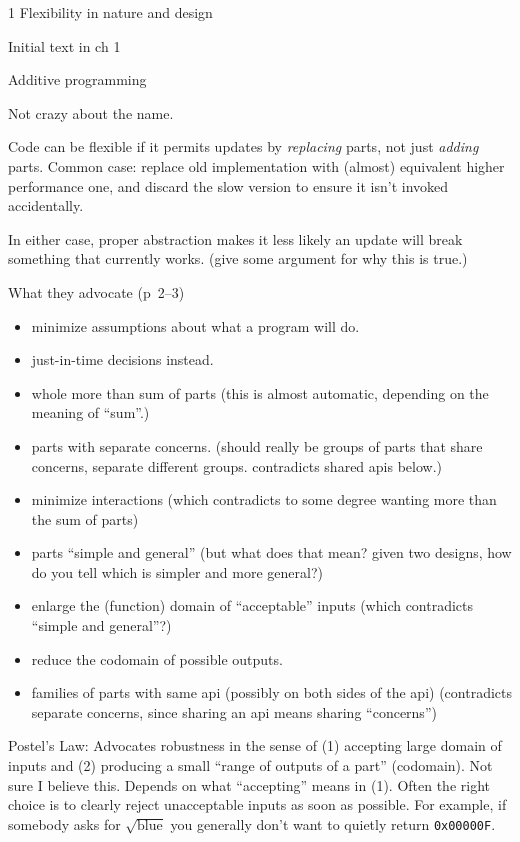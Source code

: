 \documentclass[11pt]{PalisadesLakesBook}
\begin{document}
\begin{plSection}{}
\begin{plSection}{1 Flexibility in nature and design}
\begin{plSection}{Initial text in ch 1}
\begin{plSection}{Additive programming}
\label{sec:AdditiveProgramming}

Not crazy about the name.

Code can be flexible if it permits updates by \emph{replacing}
parts, not just \emph{adding} parts.
Common case: 
replace old implementation with (almost) equivalent 
higher performance one, and discard the slow version to ensure
it isn't invoked accidentally. 

In either case, proper abstraction makes it less likely
an update will break something that currently works.
(\TODO give some argument for why this is true.)

What they advocate (p~2--3)
\begin{itemize}
  \item minimize assumptions about what a program will do.
  \item just-in-time decisions instead.
  \item whole more than sum of parts (this is almost automatic,
  depending on the meaning of ``sum''.)
  \item parts with separate concerns. (should really be groups of
  parts that share concerns, separate different groups.
  contradicts shared apis below.)
  \item minimize interactions (which contradicts to some degree
  wanting more than the sum of parts)
  \item parts ``simple and general'' 
  (but what does that mean? given two designs, how do you
  tell which is simpler and more general?)
  \item enlarge the (function) domain of ``acceptable'' inputs
  (which contradicts ``simple and general''?)
  \item reduce the codomain of possible outputs. 
  \item families of parts with same api (possibly on both sides
  of the api) (contradicts separate concerns, since sharing
  an api means sharing ``concerns'')
\end{itemize}

Postel's Law: Advocates robustness in the sense of
(1) accepting large domain of inputs
and (2) producing a small ``range of outputs of a part'' 
(codomain).
Not sure I believe this.
Depends on what ``accepting'' means in (1).
Often the right choice is to clearly reject unacceptable inputs
as soon as possible.
For example, if somebody asks for $\sqrt{\text{blue}}$
you generally don't want to quietly return \texttt{0x00000F}.


\end{plSection}
\end{plSection}
\end{plSection}
\end{plSection}
\end{document}
